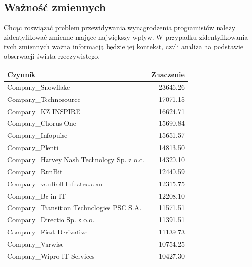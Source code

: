 \documentclass{article}
\begin{document}
\subsection{Ważność zmiennych}

Chcąc rozwiązać problem przewidywania wynagrodzenia programistów należy zidentyfikować zmienne mające
największy wpływ. W przypadku zidentyfikowania tych zmiennych ważną informacją będzie jej kontekst,
czyli analiza na podstawie obserwacji świata rzeczywistego.

\begin{table}[H]
    \centering
    \begin{tabular}{|l|r|}
        \hline
        \textbf{Czynnik}                           & \textbf{Znaczenie} \\ \hline
        Company\_Snowflake                         & 23646.26           \\ \hline
        Company\_Technosource                      & 17071.15           \\ \hline
        Company\_KZ INSPIRE                        & 16624.71           \\ \hline
        Company\_Chorus One                        & 15690.84           \\ \hline
        Company\_Infopulse                         & 15651.57           \\ \hline
        Company\_Plenti                            & 14813.50           \\ \hline
        Company\_Harvey Nash Technology Sp. z o.o. & 14320.10           \\ \hline
        Company\_RunBit                            & 12440.59           \\ \hline
        Company\_vonRoll Infratec.com              & 12315.75           \\ \hline
        Company\_Be in IT                          & 12208.10           \\ \hline
        Company\_Transition Technologies PSC S.A.  & 11571.51           \\ \hline
        Company\_Directio Sp. z o.o.               & 11391.51           \\ \hline
        Company\_First Derivative                  & 11139.73           \\ \hline
        Company\_Varwise                           & 10754.25           \\ \hline
        Company\_Wipro IT Services                 & 10427.30           \\ \hline

\end{tabular}
\end{table}
\end{document}
